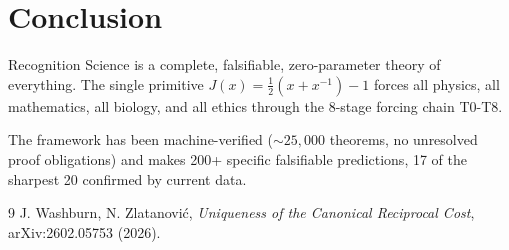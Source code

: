 \documentclass[12pt,a4paper]{article}
\theoremstyle{definition}
\theoremstyle{remark}
\begin{document}
\section{Conclusion}

Recognition Science is a complete, falsifiable, zero-parameter theory of everything. 
The single primitive $J(x) = \frac{1}{2}(x+x^{-1})-1$ forces all physics, 
all mathematics, all biology, and all ethics through the 8-stage forcing chain T0-T8. 

The framework has been machine-verified ($\sim 25{,}000$ theorems, no unresolved 
proof obligations) and makes 200+ specific falsifiable predictions, 17 of the 
sharpest 20 confirmed by current data.

\begin{thebibliography}{9}
 J. Washburn, N. Zlatanović, 
\emph{Uniqueness of the Canonical Reciprocal Cost}, 
arXiv:2602.05753 (2026).
\end{thebibliography}
\end{document}
